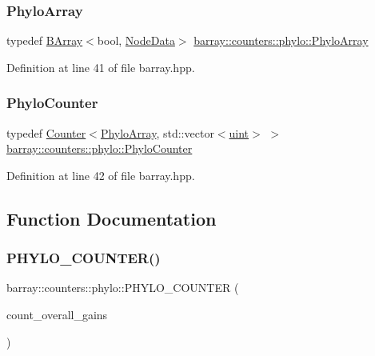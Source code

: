 \subsubsection{\texorpdfstring{Phylo\+Array}{PhyloArray}}
{\footnotesize\ttfamily typedef \hyperlink{classbarray_1_1_b_array}{B\+Array}$<$bool, \hyperlink{classbarray_1_1counters_1_1phylo_1_1_node_data}{Node\+Data}$>$ \hyperlink{namespacebarray_1_1counters_1_1phylo_ad0fe3e98c998e8e43b227fd2e97a086c}{barray\+::counters\+::phylo\+::\+Phylo\+Array}}



Definition at line 41 of file barray.\+hpp.

\mbox{\label{namespacebarray_1_1counters_1_1phylo_a89311b835ee762505a62d6cadbd6704b}} 
\subsubsection{\texorpdfstring{Phylo\+Counter}{PhyloCounter}}
{\footnotesize\ttfamily typedef \hyperlink{classbarray_1_1_counter}{Counter}$<$\hyperlink{namespacebarray_1_1counters_1_1phylo_ad0fe3e98c998e8e43b227fd2e97a086c}{Phylo\+Array}, std\+::vector$<$\hyperlink{namespacebarray_af9756a31953db233f80a9cfe1ef31c32}{uint}$>$ $>$ \hyperlink{namespacebarray_1_1counters_1_1phylo_a89311b835ee762505a62d6cadbd6704b}{barray\+::counters\+::phylo\+::\+Phylo\+Counter}}



Definition at line 42 of file barray.\+hpp.



\subsection{Function Documentation}
\mbox{\label{namespacebarray_1_1counters_1_1phylo_acb8de876a0663946d909f3410799cd81}} 
\subsubsection{\texorpdfstring{P\+H\+Y\+L\+O\+\_\+\+C\+O\+U\+N\+T\+E\+R()}{PHYLO\_COUNTER()}\hspace{0.1cm}{\footnotesize\ttfamily [1/15]}}
{\footnotesize\ttfamily barray\+::counters\+::phylo\+::\+P\+H\+Y\+L\+O\+\_\+\+C\+O\+U\+N\+T\+ER (\begin{DoxyParamCaption}\item[{count\+\_\+overall\+\_\+gains}]{ }\end{DoxyParamCaption})}




